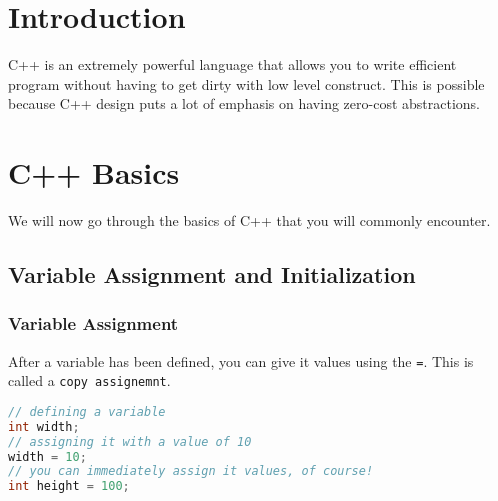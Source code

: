 \documentclass[a4paper, 12pt]{extbook}
\begin{document}
\section{Introduction}

C++ is an extremely powerful language that allows you to write efficient program without having to get dirty with low level construct.
This is possible because C++ design puts a lot of emphasis on having zero-cost abstractions.

\section{C++ Basics}

We will now go through the basics of C++ that you will commonly encounter.

\subsection{Variable Assignment and Initialization}

\subsubsection{Variable Assignment}

After a variable has been defined, you can give it values using the \verb|=|.
This is called a \verb|copy assignemnt|.

\begin{lstlisting}[language=c++]
// defining a variable
int width;
// assigning it with a value of 10
width = 10;
// you can immediately assign it values, of course!
int height = 100;
\end{lstlisting}
\end{document}
